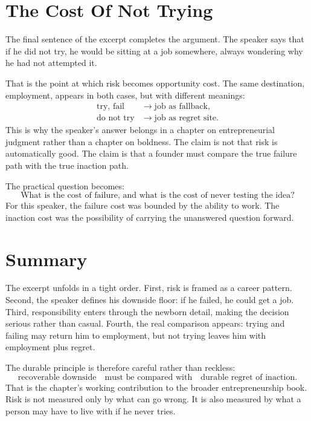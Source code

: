 \section{The Cost Of Not Trying}

The final sentence of the excerpt completes the argument. The speaker says that if he did not try, he would be sitting at a job somewhere, always wondering why he had not attempted it.

That is the point at which risk becomes opportunity cost. The same destination, employment, appears in both cases, but with different meanings:
\begin{align}
\text{try, fail} &\longrightarrow \text{job as fallback}, \\
\text{do not try} &\longrightarrow \text{job as regret site}.
\end{align}
This is why the speaker's answer belongs in a chapter on entrepreneurial judgment rather than a chapter on boldness. The claim is not that risk is automatically good. The claim is that a founder must compare the true failure path with the true inaction path.

The practical question becomes:
\begin{equation}
\text{What is the cost of failure, and what is the cost of never testing the idea?}
\end{equation}
For this speaker, the failure cost was bounded by the ability to work. The inaction cost was the possibility of carrying the unanswered question forward.

\section{Summary}

The excerpt unfolds in a tight order. First, risk is framed as a career pattern. Second, the speaker defines his downside floor: if he failed, he could get a job. Third, responsibility enters through the newborn detail, making the decision serious rather than casual. Fourth, the real comparison appears: trying and failing may return him to employment, but not trying leaves him with employment plus regret.

The durable principle is therefore careful rather than reckless:
\begin{equation}
\text{recoverable downside}
\quad \text{must be compared with} \quad
\text{durable regret of inaction}.
\end{equation}
That is the chapter's working contribution to the broader entrepreneurship book. Risk is not measured only by what can go wrong. It is also measured by what a person may have to live with if he never tries.